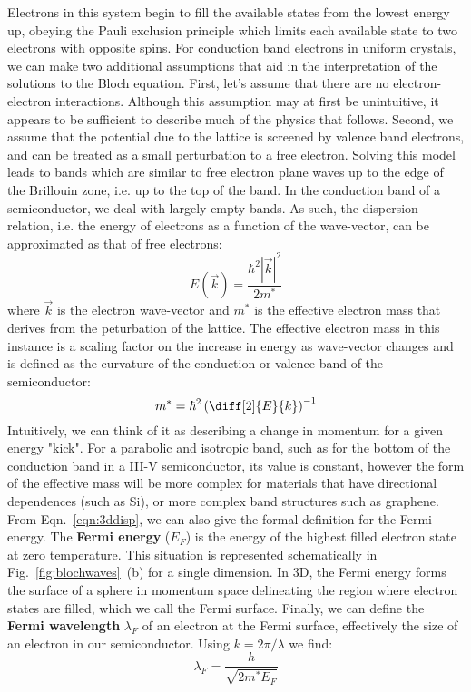 Electrons in this system begin to fill the available states from the lowest energy up, obeying the Pauli exclusion principle which limits
each available state to two electrons with opposite spins. For conduction band electrons in uniform crystals, we can make
two additional assumptions that aid in the interpretation of the solutions to the Bloch equation. First, let's assume that
there are no electron-electron interactions. Although this assumption may at first be unintuitive, it appears
to be sufficient to describe much of the physics that follows. Second, we assume that the potential due to the
lattice is screened by valence band electrons, and can be treated as a small perturbation to a free electron. Solving
this model leads to bands which are similar to free electron plane waves up to the edge of the Brillouin zone, i.e.
up to the top of the band. In the conduction band of a semiconductor, we deal with largely empty bands. As such,
the dispersion relation, i.e. the energy of electrons as a function of the wave-vector, can be approximated as that of free electrons:
\begin{equation}
  E(\vec{k}) = \frac{\hbar^2 |\vec{k}|^2}{2m^*}
  \label{eqn:3ddisp}
\end{equation}
where $\vec{k}$ is the electron wave-vector and $m^*$ is the effective electron mass that derives from the peturbation of the lattice.
The effective electron mass in this instance is a scaling factor on the increase in energy as wave-vector changes and is
defined as the curvature of the conduction or valence band of the semiconductor:
\begin{equation}
  m^* = \hbar^2 \left(\diff[2]{E}{k}\right)^{-1}
\end{equation}
Intuitively, we can think of it as describing a change in momentum for a given energy "kick". For a parabolic and isotropic
band, such as for the bottom of the conduction band in a III-V semiconductor, its value is constant, however
the form of the effective mass will be more complex for materials that have directional dependences (such as Si),
or more complex band structures such as graphene. From Eqn.~\ref{eqn:3ddisp}, we can also give the
formal definition for the Fermi energy. The \textbf{Fermi energy} ($E_F$) is the energy of the highest filled electron state
at zero temperature. This situation is represented schematically in Fig.~\ref{fig:blochwaves}~(b) for a single dimension.
In 3D, the Fermi energy forms the surface of a sphere in momentum space delineating the region where electron states are filled,
which we call the Fermi surface. Finally, we can define the \textbf{Fermi wavelength} $\lambda_F$ of an electron at the Fermi
surface, effectively the size of an electron in our semiconductor. Using $k = 2\pi/\lambda$ we find:
\begin{equation}
  \lambda_F = \frac{h}{\sqrt{2m^*E_F}}
\end{equation}

